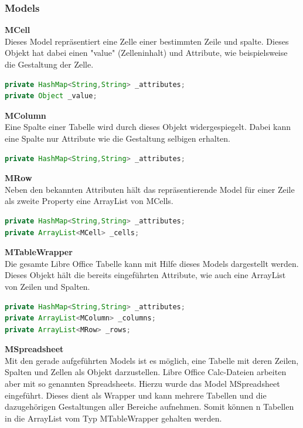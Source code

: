 \subsubsection{Models}
\label{loModels}

\textbf{MCell}\\
Dieses Model repräsentiert eine Zelle einer bestimmten Zeile und spalte. Dieses Objekt hat dabei einen "value" (Zelleninhalt) und Attribute, wie beispielsweise die Gestaltung der Zelle.

\begin{lstlisting}[caption=Repräsentation einer Zelle einer Libre Office Calc Datei, language=Java]
private HashMap<String,String> _attributes;
private Object _value;
\end{lstlisting}
\textbf{MColumn}\\
Eine Spalte einer Tabelle wird durch dieses Objekt widergespiegelt. Dabei kann eine Spalte nur Attribute wie die Gestaltung selbigen erhalten.
\begin{lstlisting}[caption=Repräsentation einer Spalte einer Libre Office Calc Datei, language=Java]
private HashMap<String,String> _attributes;
\end{lstlisting}
\textbf{MRow}\\
Neben den bekannten Attributen hält das repräsentierende Model für einer Zeile als zweite Property eine ArrayList von MCells.
\begin{lstlisting}[caption=Repräsentation einer Zeile einer Libre Office Calc Datei, language=Java]
private HashMap<String,String> _attributes;
private ArrayList<MCell> _cells;
\end{lstlisting}
\textbf{MTableWrapper}\\
Die gesamte Libre Office Tabelle kann mit Hilfe dieses Models dargestellt werden. Dieses Objekt hält die bereits eingeführten Attribute, wie auch eine ArrayList von Zeilen und Spalten.
\begin{lstlisting}[caption=Repräsentation einer Tabelle einer Libre Office Calc Datei inkl. aller Zeilen und Spalten, language=Java]
private HashMap<String,String> _attributes;
private ArrayList<MColumn> _columns;
private ArrayList<MRow> _rows;
\end{lstlisting}
\textbf{MSpreadsheet}\\
Mit den gerade aufgeführten Models ist es möglich, eine Tabelle mit deren Zeilen, Spalten und Zellen als Objekt darzustellen. Libre Office Calc-Dateien arbeiten aber mit so genannten Spreadsheets. Hierzu wurde das Model MSpreadsheet eingeführt. Dieses dient als Wrapper und kann mehrere Tabellen und die dazugehörigen Gestaltungen aller Bereiche aufnehmen. Somit können n Tabellen in die ArrayList vom Typ MTableWrapper gehalten werden.

